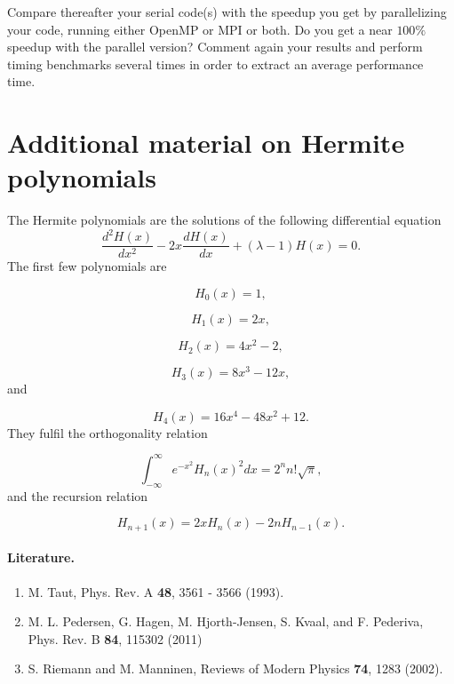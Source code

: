 \documentclass[%
oneside,                 %
final,                   %
10pt]{article}
\begin{document}
Compare thereafter your serial code(s)  with the speedup you get by parallelizing your code, running either OpenMP or MPI or both.
Do you get a near $100\%$ speedup with the parallel version? Comment again your results and perform timing benchmarks several times in order 
to extract  an average performance time. 

\section*{Additional material on Hermite polynomials}

The Hermite polynomials are the solutions of the following differential
equation
\begin{equation}
   \frac{d^2H(x)}{dx^2}-2x\frac{dH(x)}{dx}+
       (\lambda-1)H(x)=0.
   \label{eq:hermite}
\end{equation}
The first few polynomials are

\begin{equation*}
   H_0(x)=1,
\end{equation*}

\begin{equation*}
    H_1(x)=2x,
\end{equation*}

\begin{equation*}
    H_2(x)=4x^2-2,
\end{equation*}

\begin{equation*}
    H_3(x)=8x^3-12x,
\end{equation*}
and

\begin{equation*}
    H_4(x)=16x^4-48x^2+12.
\end{equation*}
They fulfil the orthogonality relation

\begin{equation*}
  \int_{-\infty}^{\infty}e^{-x^2}H_n(x)^2dx=2^nn!\sqrt{\pi},
\end{equation*}
and the recursion relation

\begin{equation*}
  H_{n+1}(x)=2xH_{n}(x)-2nH_{n-1}(x).
\end{equation*}

\paragraph{Literature.}
\begin{enumerate}
 \item M. Taut, Phys. Rev. A \textbf{48}, 3561 - 3566 (1993).

 \item M. L. Pedersen, G. Hagen, M. Hjorth-Jensen, S. Kvaal,  and F. Pederiva, Phys. Rev. B \textbf{84}, 115302 (2011)

 \item S. Riemann and M. Manninen, Reviews of Modern Physics \textbf{74}, 1283 (2002). 
\end{enumerate}
\end{document}
